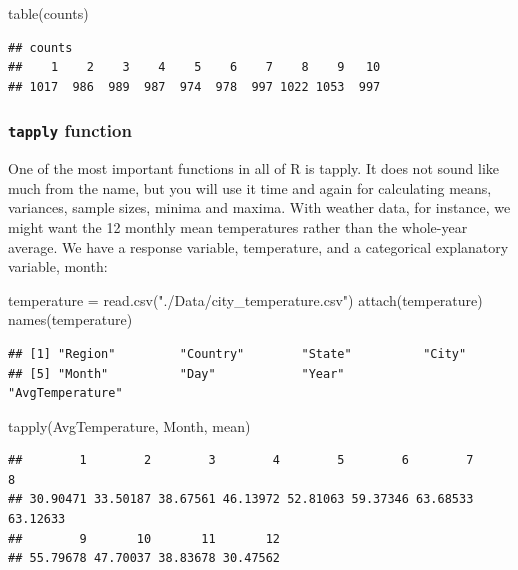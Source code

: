 \documentclass[
]{book}
\newenvironment{Shaded}{\begin{snugshade}}{\end{snugshade}}
\newcommand{\FunctionTok}[1]{\textcolor[rgb]{0.00,0.00,0.00}{#1}}
\newcommand{\NormalTok}[1]{#1}
\newcommand{\OtherTok}[1]{\textcolor[rgb]{0.56,0.35,0.01}{#1}}
\newcommand{\StringTok}[1]{\textcolor[rgb]{0.31,0.60,0.02}{#1}}
\theoremstyle{definition}
\theoremstyle{definition}
\theoremstyle{definition}
\theoremstyle{definition}
\theoremstyle{remark}
\begin{document}
\begin{Shaded}
\begin{Highlighting}[]
\FunctionTok{table}\NormalTok{(counts)}
\end{Highlighting}
\end{Shaded}

\begin{verbatim}
## counts
##    1    2    3    4    5    6    7    8    9   10 
## 1017  986  989  987  974  978  997 1022 1053  997
\end{verbatim}

\hypertarget{tapply-function}{%
\subsubsection{\texorpdfstring{\texttt{tapply} function}{tapply function}}\label{tapply-function}}

One of the most important functions in all of R is tapply. It does not sound like much from the name, but you will use it time and again for calculating means, variances, sample sizes, minima and maxima. With weather data, for instance, we might want the 12 monthly mean temperatures rather than the whole-year average. We have a response variable, temperature, and a categorical explanatory variable, month:

\begin{Shaded}
\begin{Highlighting}[]
\NormalTok{temperature }\OtherTok{=} \FunctionTok{read.csv}\NormalTok{(}\StringTok{"./Data/city\_temperature.csv"}\NormalTok{)}
\FunctionTok{attach}\NormalTok{(temperature)}
\FunctionTok{names}\NormalTok{(temperature)}
\end{Highlighting}
\end{Shaded}

\begin{verbatim}
## [1] "Region"         "Country"        "State"          "City"          
## [5] "Month"          "Day"            "Year"           "AvgTemperature"
\end{verbatim}

\begin{Shaded}
\begin{Highlighting}[]
\FunctionTok{tapply}\NormalTok{(AvgTemperature, Month, mean)}
\end{Highlighting}
\end{Shaded}

\begin{verbatim}
##        1        2        3        4        5        6        7        8 
## 30.90471 33.50187 38.67561 46.13972 52.81063 59.37346 63.68533 63.12633 
##        9       10       11       12 
## 55.79678 47.70037 38.83678 30.47562
\end{verbatim}
\end{document}
